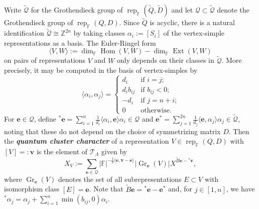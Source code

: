 \documentclass[12pt]{amsart}
\newcommand{\bfe}{\mathbf{e}}
\newcommand{\bfv}{\mathbf{v}}
\newcommand{\cQ}{\mathcal{Q}}
\newcommand{\cT}{\mathcal{T}}
\newcommand{\FF}{\mathbb{F}}
\newcommand{\Ext}{\operatorname{Ext}}
\newcommand{\Gr}{\operatorname{Gr}}
\newcommand{\half}{{\frac{1}{2}}}
\newcommand{\Hom}{\operatorname{Hom}}
\newcommand{\rep}{\operatorname{rep}}
\newcommand{\ZZ}{\mathbb{Z}}
\newcommand{\newword}[1]{\textbf{\emph{#1}}}
\begin{document}
  Write $\widetilde{\cQ}$ for the Grothendieck group of $\rep_\FF(\widetilde{Q},\widetilde{D})$ and let $\cQ\subset\widetilde{\cQ}$ denote the Grothendieck group of $\rep_\FF(Q,D)$.
  Since $\widetilde{Q}$ is acyclic, there is a natural identification $\widetilde{\cQ}\cong\ZZ^{2n}$ by taking classes $\alpha_i:=[S_i]$ of the vertex-simple representations as a basis.
  The Euler-Ringel form
  \[
    \langle V,W\rangle:=\dim_\FF\Hom(V,W)-\dim_\FF\Ext(V,W)
  \]
  on pairs of representations $V$ and $W$ only depends on their classes in $\widetilde{\cQ}$.  
  More precisely, it may be computed in the basis of vertex-simples by
  \[
    \langle\alpha_i,\alpha_j\rangle
    =
    \begin{cases} 
      d_i & \text{if $i=j$;}\\
      d_ib_{ij} & \text{if $b_{ij}<0$;}\\
      -d_i & \text{if $j=n+i$;}\\
      0 & \text{otherwise.}
    \end{cases}
  \]
  For $\bfe\in\cQ$, define ${}^*\bfe=\sum\limits_{i=1}^n\frac{1}{d_i}\langle\alpha_i,\bfe\rangle\alpha_i\in\cQ$ and $\bfe^*=\sum\limits_{j=1}^{2n}\frac{1}{d_j}\langle\bfe,\alpha_j\rangle\alpha_j\in\widetilde{\cQ}$, noting that these do not depend on the choice of symmetrizing matrix $D$. 
  Then the \newword{quantum cluster character} of a representation $V\in\rep_\FF(Q,D)$ with $[V]=:\bfv$ is the element of $\cT_\Lambda$  given by 
  \[
    X_V
    :=
    \sum\limits_{\bfe\in\cQ} |\FF|^{-\half\langle\bfe,\bfv-\bfe\rangle}\big|\!\Gr_\bfe(V)\big|X^{\widetilde{B}\bfe-{}^*\bfv},
  \] 
  where $\Gr_\bfe(V)$ denotes the set of all subrepresentations $E\subset V$ with isomorphism class $[E]=\bfe$.  
  Note that $\widetilde{B}\bfe={}^*\bfe-\bfe^*$ and, for $j\in[1,n]$, we have ${}^*\alpha_j=\alpha_j+\sum\limits_{i=1}^{n}\min(b_{ij},0)\alpha_i$.
\end{document}
